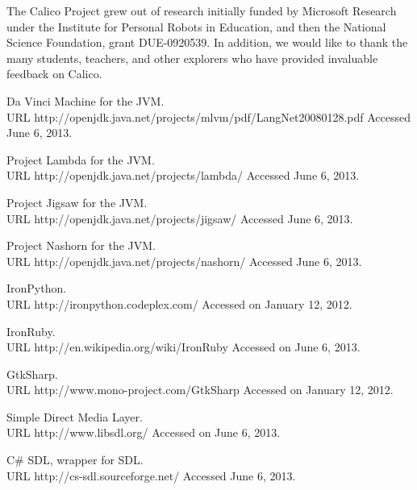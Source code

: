 \documentclass[preprint]{sigplanconf}
\begin{document}

\acks

The Calico Project grew out of research initially funded by Microsoft
Research under the Institute for Personal Robots in Education, and
then the National Science Foundation, grant DUE-0920539. In addition,
we would like to thank the many students, teachers, and other
explorers who have provided invaluable feedback on Calico.





\begin{thebibliography}{}
\softraggedright

Da Vinci Machine for the JVM.\\ URL http://openjdk.java.net/projects/mlvm/pdf/LangNet20080128.pdf Accessed June 6, 2013.

Project Lambda for the JVM.\\ URL http://openjdk.java.net/projects/lambda/ Accessed June 6, 2013.

Project Jigsaw for the JVM.\\ URL http://openjdk.java.net/projects/jigsaw/ Accessed June 6, 2013.

Project Nashorn for the JVM.\\ URL http://openjdk.java.net/projects/nashorn/ Accessed June 6, 2013.

IronPython.\\ URL http://ironpython.codeplex.com/ Accessed on January 12, 2012.

IronRuby.\\ URL http://en.wikipedia.org/wiki/IronRuby Accessed on June 6, 2013.

GtkSharp.\\ URL http://www.mono-project.com/GtkSharp Accessed on January 12, 2012.

Simple Direct Media Layer.\\ URL http://www.libsdl.org/ Accessed on June 6, 2013.

C\# SDL, wrapper for SDL.\\ URL http://cs-sdl.sourceforge.net/ Accessed June 6, 2013.


\end{thebibliography}
\end{document}
